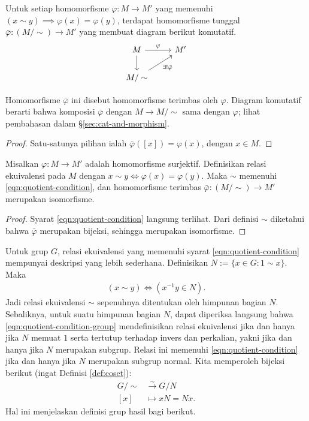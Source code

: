 \begin{proposition}\label{prop:quotient-monoid-univ-prop}
	Untuk setiap homomorfisme $\varphi: M \to M'$ yang memenuhi $(x \sim y) \implies \varphi(x)=\varphi(y)$, terdapat homomorfisme tunggal $\bar{\varphi}: (M/\sim) \to M'$ yang membuat diagram berikut komutatif.
	\[ \begin{tikzcd}
		M \arrow[r, "\varphi"] \arrow[d] & M' \\
		M/\sim \arrow[ru, "{\exists! \bar{\varphi}}"'] &
	\end{tikzcd} \]
\end{proposition}
Homomorfisme $\bar{\varphi}$ ini disebut homomorfisme terimbas oleh $\varphi$. Diagram komutatif berarti bahwa komposisi $\bar{\varphi}$ dengan $M \to M/\sim$ sama dengan $\varphi$; lihat pembahasan dalam \S\ref{sec:cat-and-morphism}.
\begin{proof}
	Satu-satunya pilihan ialah $\bar{\varphi}([x]) = \varphi(x)$, dengan $x \in M$.
\end{proof}

\begin{proposition}\label{prop:1st-homomorphism-monoid}
	Misalkan $\varphi: M \to M'$ adalah homomorfisme surjektif. Definisikan relasi ekuivalensi pada $M$ dengan $x \sim y \iff \varphi(x)=\varphi(y)$. Maka $\sim$ memenuhi \eqref{eqn:quotient-condition}, dan homomorfisme terimbas $\bar{\varphi}: (M/\sim) \to M'$ merupakan isomorfisme.
\end{proposition}
\begin{proof}
	Syarat \eqref{eqn:quotient-condition} langsung terlihat. Dari definisi $\sim$ diketahui bahwa $\bar{\varphi}$ merupakan bijeksi, sehingga merupakan isomorfisme.
\end{proof}

Untuk grup $G$, relasi ekuivalensi yang memenuhi syarat \eqref{eqn:quotient-condition} mempunyai deskripsi yang lebih sederhana. Definisikan $N := \{x \in G : 1 \sim x\}$. Maka
\begin{gather}\label{eqn:quotient-condition-group}
	(x \sim y) \iff \left( x^{-1} y \in N \right).
\end{gather}
Jadi relasi ekuivalensi $\sim$ sepenuhnya ditentukan oleh himpunan bagian $N$. Sebaliknya, untuk suatu himpunan bagian $N$, dapat diperiksa langsung bahwa \eqref{eqn:quotient-condition-group} mendefinisikan relasi ekuivalensi jika dan hanya jika $N$ memuat $1$ serta tertutup terhadap invers dan perkalian, yakni jika dan hanya jika $N$ merupakan subgrup. Relasi ini memenuhi \eqref{eqn:quotient-condition} jika dan hanya jika $N$ merupakan subgrup normal. Kita memperoleh bijeksi berikut (ingat Definisi \ref{def:coset}):
\begin{align*}
	G/\sim & \stackrel{\sim}{\longrightarrow} G/N \\
	[x] & \longmapsto xN = Nx.
\end{align*}
Hal ini menjelaskan definisi grup hasil bagi berikut.

